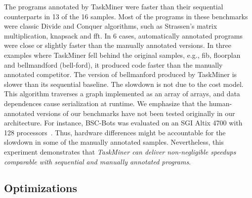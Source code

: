 \documentclass[sigplan,10pt,screen]{acmart}
\newcommand\Taskminer{\mbox{\textsf{TaskMiner}}}
\begin{document}
The programs annotated by \Taskminer{} were faster than their sequential
counterparts in 13 of the 16 samples.
Most of the programs in these benchmarks were classic Divide and Conquer algorithms, such as \textsf{Strassen}'s matrix multiplication, \textsf{knapsack}
and \textsf{fft}.
In 6 cases, automatically annotated programs were close or slightly faster than the manually
annotated versions.
In three examples where \Taskminer{} fell behind the original samples, e.g.,
\textsf{fib}, \textsf{floorplan} and \textsf{bellmandford} (\textsf{bell-ford}),
it produced code faster than the manually annotated competitor.
The version of \textsf{bellmanford} produced by \Taskminer{} is slower than its sequential
baseline.
The slowdown is not due to the cost model.
This algorithm traverses a graph implemented as an array of arrays, and data dependences
cause serialization at runtime.
We emphasize that the human-annotated versions of our benchmarks have not
been tested originally in our architecture.
For instance, \textsf{BSC-Bots} was evaluated on an SGI Altix 4700
with 128 processors~\cite{Duran09}.
Thus, hardware differences might be accountable for the slowdown in
some of the manually annotated samples.
Nevertheless, this experiment demonstrates that {\em \Taskminer{} can
deliver non-negligible speedups comparable with sequential and manually
annotated programs}.

\subsection{Optimizations}
\label{sub:optimizations}
\end{document}
